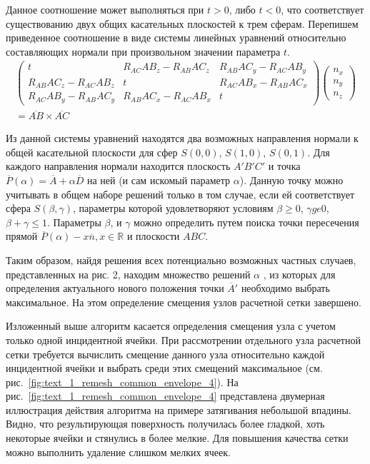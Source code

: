 Данное соотношение может выполняться при $t > 0$, либо $t < 0$, что соответствует существованию двух общих касательных плоскостей к трем сферам.
Перепишем приведенное соотношение в виде системы линейных уравнений относительно составляющих нормали при произвольном значении параметра $t$.
\begin{multline}
	\begin{pmatrix}
		t                         & R_{AC} AB_z - R_{AB} AC_z & R_{AB} AC_y - R_{AC} AB_y \\
		R_{AB} AC_z - R_{AC} AB_z & t                         & R_{AC} AB_x - R_{AB} AC_x \\
		R_{AC} AB_y - R_{AB} AC_y & R_{AB} AC_x - R_{AC} AB_x & t
	\end{pmatrix}
	\begin{pmatrix}
		n_x \\
		n_y \\
		n_z
	\end{pmatrix} \\
	= \overline{AB} \times \overline{AC}
\end{multline}

Из данной системы уравнений находятся два возможных направления нормали к общей касательной плоскости для сфер $S(0,0)$, $S(1,0)$, $S(0,1)$.
Для каждого направления нормали находится плоскость $A'B'C'$ и точка $\overline{P}(\alpha) = \overline{A} + \alpha \overline{D}$ на ней (и сам искомый параметр $\alpha$).
Данную точку можно учитывать в общем наборе решений только в том случае, если ей соответствует сфера $S(\beta, \gamma)$, параметры которой удовлетворяют условиям $\beta \ge 0$, $\gamma ge 0$, $\beta + \gamma \le 1$.
Параметры $\beta$, и $\gamma$ можно определить путем поиска точки пересечения прямой $\overline{P}(\alpha) - x \overline{n}, x \in \mathbb{R}$ и плоскости $ABC$.

Таким образом, найдя решения всех потенциально возможных частных случаев, представленных на рис. 2, находим множество решений $\alpha$ , из которых для определения актуального нового положения точки $\overline{A}'$ необходимо выбрать максимальное.
На этом определение смещения узлов расчетной сетки завершено.

Изложенный выше алгоритм касается определения смещения узла с учетом только одной инцидентной ячейки.
При рассмотрении отдельного узла расчетной сетки требуется вычислить смещение данного узла относительно каждой инцидентной ячейки и выбрать среди этих смещений максимальное (см. рис.~\ref{fig:text_1_remesh_common_envelope_4}).
На рис.~\ref{fig:text_1_remesh_common_envelope_4} представлена двумерная иллюстрация действия алгоритма на примере затягивания небольшой впадины.
Видно, что результирующая поверхность получилась более гладкой, хоть некоторые ячейки и стянулись в более мелкие.
Для повышения качества сетки можно выполнить удаление слишком мелких ячеек.

